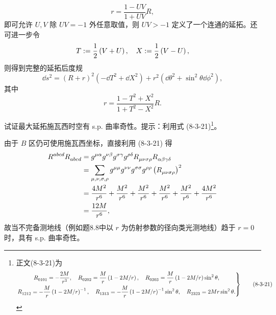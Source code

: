 \begin{xiti}
\begin{jie}
		\begin{equation*}
			r = \frac{1 - U V}{1 + U V} R,
		\end{equation*}
		即可允许 $U, V$ 除 $U V = - 1$ 外任意取值，则 $U V > -1$ 定义了一个连通的延拓。还可进一步令
		\begin{equation*}
			T := \frac{1}{2} \left( V + U \right) \qc X := \frac{1}{2} \left( V - U \right),
		\end{equation*}
		则得到完整的延拓后度规
		\begin{equation*}
			\dd s^2 = \left( R + r \right)^2 \left( - \dd{T}^2 + \dd{X}^2 \right) + r^2 \left( \dd \theta^2 + \sin^2 \theta \dd \phi^2 \right),
		\end{equation*}
		其中
		\begin{equation*}
			r = \frac{1 - T^2 + X^2}{1 + T^2 - X^2} R.
		\end{equation*}
	\end{jie}

	\item 试证最大延拓施瓦西时空有 s.p. 曲率奇性。提示：利用式 (8-3-21)\footnote{正文(8-3-21)为
	\begin{equation}
		\left.
			\begin{gathered}
				\tensor{R}{_0_1_0_1} = -\frac{2M}{r^3} \qc \tensor{R}{_0_2_0_2} = \frac{M}{r} \left( 1 - 2M/r \right) \qc \tensor{R}{_0_3_0_3} = \frac{M}{r}\left( 1 - 2M/r \right) \sin^2\theta,\\
				\tensor{R}{_1_2_1_2} = - \frac{M}{r} \left( 1 - 2M/r \right)^{-1} \qc \tensor{R}{_1_3_1_3} = - \frac{M}{r} \left( 1 - 2M/r \right)^{-1} \sin^2 \theta \qc \tensor{R}{_2_3_2_3} = 2 M r \sin^2 \theta.
			\end{gathered}
		\right\}
		\tag{8-3-21}
	\end{equation}}。
	\begin{zm}
		由于 $B$ 区仍可使用施瓦西坐标，直接利用 (8-3-21) 得
		\begin{align*}
			\tensor{R}{^a^b^c^d} \tensor{R}{_a_b_c_d} &= \tensor{g}{^\mu^\alpha} \tensor{g}{^\nu^\beta} \tensor{g}{^\sigma^\gamma} \tensor{g}{^\rho^\delta} \tensor{R}{_\mu_\nu_\sigma_\rho} \tensor{R}{_\alpha_\beta_\gamma_\delta}\\
			&= \sum_{\mu,\nu,\sigma,\rho} \tensor{g}{^\mu^\mu} \tensor{g}{^\nu^\nu} \tensor{g}{^\sigma^\sigma} \tensor{g}{^\rho^\rho} \left( \tensor{R}{_\mu_\nu_\sigma_\rho} \right)^2\\
			&= \frac{4M^2}{r^6} + \frac{M^2}{r^6} + \frac{M^2}{r^6} + \frac{M^2}{r^6} + \frac{M^2}{r^6} + \frac{4M^2}{r^6}\\
			&= \frac{12 M}{r^6},
		\end{align*}
		故当不完备测地线（例如题8.8中以 $r$ 为仿射参数的径向类光测地线）趋于 $r=0$ 时，具有 s.p. 曲率奇性。
	\end{zm}


\end{xiti}

